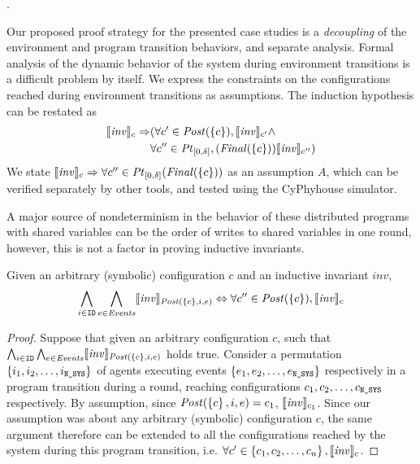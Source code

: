 .

Our proposed proof strategy for the presented case studies is a \emph{decoupling} of the environment and program transition behaviors, and separate analysis. Formal analysis of the dynamic behavior of the system during environment transitions is a difficult problem by itself. We express the constraints on the configurations reached during environment transitions as assumptions. The induction hypothesis can be restated as \begin{align*}\llbracket\mathit{inv}\rrbracket_{c} \Rightarrow &(\forall c' \in \mathit{Post}(\left\{c\right\}), \llbracket\mathit{inv}\rrbracket_{c'} \wedge \\ &\forall c'' \in \mathit{Pt}_{[0,\delta]},(\mathit{Final}(\left\{c\right\})) \llbracket\mathit{inv}\rrbracket_{c''})\end{align*} We state $\llbracket\mathit{inv}\rrbracket_{c} \Rightarrow \forall c'' \in \mathit{Pt}_{[0,\delta]}(\mathit{Final}(\left\{c\right\})) $ as an assumption $A$, which can be verified separately by other tools, and tested using the CyPhyhouse simulator.

 A major source of nondeterminism in the behavior of these distributed programs with shared variables can be the order of writes to shared variables in one round, however, this is not a factor in proving inductive invariants.

\begin{lemma}
   \label{noninter}
Given an arbitrary (symbolic) configuration $c$ and an inductive invariant $\mathit{inv}$,
   {\small
   $$\bigwedge_{i\in \texttt{ID}}\bigwedge_{e \in \mathit{Events}}  \llbracket\mathit{inv}\rrbracket_{\mathit{Post}(\left\{c\right\}, i, e)} \Leftrightarrow \forall c'' \in \mathit{Post}(\left\{c\right\}), \llbracket\mathit{inv}\rrbracket_{c}$$ }
\end{lemma}
\begin{proof}
Suppose that given an arbitrary configuration $c$, such that $\bigwedge_{i\in \texttt{ID}}\bigwedge_{e \in \mathit{Events}} \llbracket\mathit{inv}\rrbracket_{\mathit{Post}(\left\{c\right\}, i, e)}$ holds true. Consider a permutation $\left\{i_1,i_2,\ldots,i_{\texttt{N\_SYS}}\right\}$ of agents executing events $\left\{e_1, e_2, \ldots , e_{\texttt{N\_SYS}}\right\}$ respectively in a program transition during a round, reaching configurations $c_1, c_2, \ldots, c_{\texttt{N\_SYS}}$ respectively. By assumption, since $\mathit{Post}(\left\{c\right\},i,e) = c_1$, $\llbracket\mathit{inv}\rrbracket_{c_1}$. Since our assumption was about any arbitrary (symbolic) configuration $c$, the same argument therefore can be extended to all the configurations reached by the system during this program transition, i.e. $\forall c' \in \left\{c_1, c_2, \ldots, c_n\right\}, \llbracket\mathit{inv}\rrbracket_{c}$.
\end{proof}

